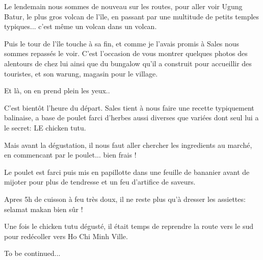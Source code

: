 \begin{multicols}{2}

Le lendemain nous sommes de nouveau sur les routes, pour aller voir Ugung Batur, le plus gros volcan de l'île, en passant par une multitude de petits temples typiques... c'est même un volcan dans un volcan.


Puis le tour de l'île touche à sa fin, et comme je l'avais promis à Sales nous sommes repassés le voir. C'est l'occasion de vous montrer quelques photos des alentours de chez lui ainsi que du bungalow qu'il a construit pour accueillir des touristes, et son warung, magasin pour le village.


Et là, on en prend plein les yeux..


C'est bientôt l'heure du départ. Sales tient à nous faire une recette typiquement balinaise, a base de poulet farci d'herbes aussi diverses que variées dont seul lui a le secret: LE chicken tutu.

Mais avant la dégustation, il nous faut aller chercher les ingredients au marché, en commencant par le poulet... bien frais !


Le poulet est farci puis mis en papillotte dans une feuille de bananier avant de mijoter pour plus de tendresse et un feu d'artifice de saveurs.


Apres 5h de cuisson à feu très doux, il ne reste plus qu'à dresser les assiettes: selamat makan bien sûr !


Une fois le chicken tutu dégusté, il était temps de reprendre la route vers le sud pour redécoller vers Ho Chi Minh Ville.

To be continued...

\end{multicols}


